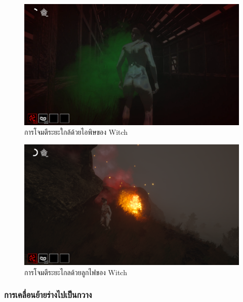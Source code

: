 \begin{figure}[p]
  \begin{center}
  \includegraphics[width=\textwidth]{./img/mechanics/breath_of_death.png}
  \end{center}
    \caption[การโจมตีระยะใกล้ด้วยไอพิษของ Witch]{การโจมตีระยะใกล้ด้วยไอพิษของ Witch}
    \label{การโจมตีระยะใกล้ด้วยไอพิษ}    
\end{figure}

\begin{figure}[p]
  \begin{center}
  \includegraphics[width=\textwidth]{./img/mechanics/inferno_soul.png}
  \end{center}
    \caption[การโจมตีระยะไกลด้วยลูกไฟของ Witch]{การโจมตีระยะไกลด้วยลูกไฟของ Witch}\label{การโจมตีระยะไกลด้วยลูกไฟ}
    \label{การจับกวางโดยใช้มีด}
\end{figure}

\subsubsection{การเคลื่อนย้ายร่างไปเป็นกวาง}

